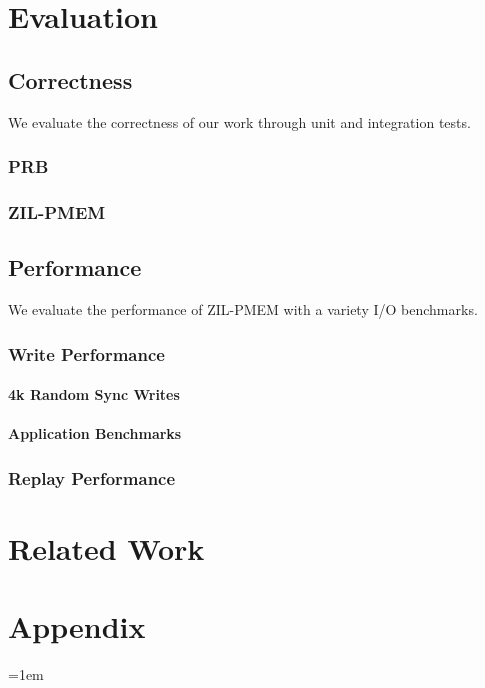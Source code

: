\documentclass[12pt,a4paper,twoside,draft]{book}
\begin{document}
\chapter{Evaluation}\label{ch:eval}
\section{Correctness}
We evaluate the correctness of our work through unit and integration tests.
\subsection{PRB}
\subsection{ZIL-PMEM}
\section{Performance}
We evaluate the performance of ZIL-PMEM with a variety I/O benchmarks.
\subsection{Write Performance}
\subsubsection{4k Random Sync Writes}
\subsubsection{Application Benchmarks}
\subsection{Replay Performance}

\chapter{Related Work}

\backmatter

\chapter{Appendix}\label{ch:appendix}

\cleardoublepage
{}
{}
\emergencystretch=1em
\printbibliography
\end{document}
